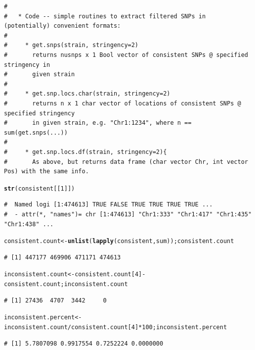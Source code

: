 \documentclass{article}\usepackage[]{graphicx}\usepackage[]{color}
\makeatletter
\newcommand{\hlnum}[1]{\textcolor[rgb]{0.686,0.059,0.569}{#1}}%
\newcommand{\hlopt}[1]{\textcolor[rgb]{0,0,0}{#1}}%
\newcommand{\hlstd}[1]{\textcolor[rgb]{0.345,0.345,0.345}{#1}}%
\newcommand{\hlkwb}[1]{\textcolor[rgb]{0.69,0.353,0.396}{#1}}%
\newcommand{\hlkwd}[1]{\textcolor[rgb]{0.737,0.353,0.396}{\textbf{#1}}}%
\newenvironment{kframe}{%
 \def\at@end@of@kframe{}%
 \ifinner\ifhmode%
  \def\at@end@of@kframe{\end{minipage}}%
  \begin{minipage}{\columnwidth}%
 \fi\fi%
 \def\FrameCommand##1{\hskip\@totalleftmargin \hskip-\fboxsep
 \colorbox{shadecolor}{##1}\hskip-\fboxsep
     \hskip-\linewidth \hskip-\@totalleftmargin \hskip\columnwidth}%
 \MakeFramed {\advance\hsize-\width
   \@totalleftmargin\z@ \linewidth\hsize
   \@setminipage}}%
 {\par\unskip\endMakeFramed%
 \at@end@of@kframe}
\newenvironment{knitrout}{}{} %
\makeatother
\begin{document}
\begin{knitrout}
\begin{kframe}
\begin{verbatim}
# 
#   * Code -- simple routines to extract filtered SNPs in (potentially) convenient formats:
# 
#     * get.snps(strain, stringency=2)
#       returns nusnps x 1 Bool vector of consistent SNPs @ specified stringency in
#       given strain
# 
#     * get.snp.locs.char(strain, stringency=2)
#       returns n x 1 char vector of locations of consistent SNPs @ specified stringency
#       in given strain, e.g. "Chr1:1234", where n == sum(get.snps(...))
# 
#     * get.snp.locs.df(strain, stringency=2){
#       As above, but returns data frame (char vector Chr, int vector Pos) with the same info.
\end{verbatim}
\end{kframe}
\end{knitrout}
\begin{knitrout}\tiny
{}\color{fgcolor}\begin{kframe}
\begin{alltt}
\hlkwd{str}\hlstd{(consistent[[}\hlnum{1}\hlstd{]])}
\end{alltt}
\begin{verbatim}
#  Named logi [1:474613] TRUE FALSE TRUE TRUE TRUE TRUE ...
#  - attr(*, "names")= chr [1:474613] "Chr1:333" "Chr1:417" "Chr1:435" "Chr1:438" ...
\end{verbatim}
\end{kframe}
\end{knitrout}
\begin{knitrout}\footnotesize
{}\color{fgcolor}\begin{kframe}
\begin{alltt}
\hlstd{consistent.count} \hlkwb{<-} \hlkwd{unlist}\hlstd{(}\hlkwd{lapply}\hlstd{(consistent, sum)) ; consistent.count}
\end{alltt}
\begin{verbatim}
# [1] 447177 469906 471171 474613
\end{verbatim}
\begin{alltt}
\hlstd{inconsistent.count} \hlkwb{<-} \hlstd{consistent.count[}\hlnum{4}\hlstd{]} \hlopt{-} \hlstd{consistent.count; inconsistent.count}
\end{alltt}
\begin{verbatim}
# [1] 27436  4707  3442     0
\end{verbatim}
\begin{alltt}
\hlstd{inconsistent.percent} \hlkwb{<-} \hlstd{inconsistent.count}\hlopt{/}\hlstd{consistent.count[}\hlnum{4}\hlstd{]}\hlopt{*}\hlnum{100}\hlstd{; inconsistent.percent}
\end{alltt}
\begin{verbatim}
# [1] 5.7807098 0.9917554 0.7252224 0.0000000
\end{verbatim}
\end{kframe}
\end{knitrout}
\end{document}
